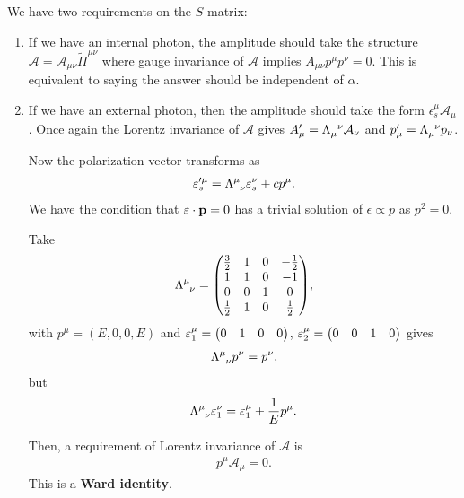 We have two requirements on the $S$-matrix:
\begin{enumerate}
    \item If we have an internal photon, the amplitude should take the structure $\mathcal{A} = \mathcal{A}_{\mu \nu} \widetilde{\Pi}^{\mu \nu}$ where gauge invariance of $\mathcal{A}$ implies $A_{\mu \nu} p^{\mu} p^{\nu} = 0$. This is equivalent to saying the answer should be independent of $\alpha$.
    \item If we have an external photon, then the amplitude should take the form $\epsilon^{\mu}_s \mathcal{A}_\mu$. Once again the Lorentz invariance of $\mathcal{A}$ gives $A'_\mu = \tensor{\Lambda}{_\mu}^{\nu} \mathcal{A}_\nu$ and $p'_\mu = \tensor{\Lambda}{_\mu^{\nu}} p_\nu$.

        Now the polarization vector transforms as
        \begin{align}
            \epsilon'^{\mu}_s = \tensor{\Lambda}{^{\mu}_\nu} \epsilon^{\nu}_s + c p^{\mu}
        .\end{align}
        We have the condition that $\varepsilon \cdot \vb{p} = 0$ has a trivial solution of $\epsilon \propto p$ as $p^2 = 0$.
        \begin{example}
            Take
            \begin{align}
                \tensor{\Lambda}{^{\mu}_\nu} = \mqty( \frac{3}{2} & 1 & 0 & -\frac{1}{2} \\ 1 & 1 & 0 & -1 \\ 0 & 0 & 1 & 0 \\ \frac{1}{2}  & 1 & 0 & \frac{1}{2} )
            ,\end{align}
            with $p^{\mu} = \left( E,0,0,E \right) $ and $\epsilon^{\mu}_1 = \mqty( 0 & 1 & 0 & 0)$, $\epsilon^{\mu}_2 = \mqty( 0 & 0 & 1 & 0)$ gives
            \begin{align}
                \tensor{\Lambda}{^{\mu}_\nu} p^{\nu} = p^{\nu}
            ,\end{align}
            but
            \begin{align}
                \tensor{\Lambda}{^{\mu}_\nu} \epsilon^{\nu}_1 = \epsilon^{\mu}_1 + \frac{1}{E} p^{\mu}
            .\end{align}
        \end{example}
        Then, a requirement of Lorentz invariance of $\mathcal{A}$ is
        \begin{align}
            p^{\mu} \mathcal{A}_\mu = 0
        .\end{align}
        This is a \textbf{Ward identity}.
\end{enumerate}

